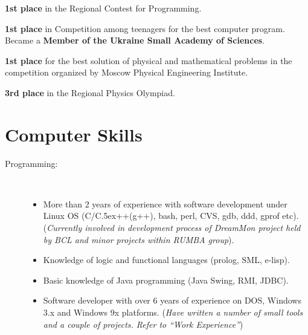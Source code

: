 \documentclass[10pt,overlapped,line]{res}
\def\Cplusplus{{\rm C\raise.5ex\hbox{\small ++}}}
\newcommand{\mplace}[1]{\textbf{#1}}
\newcommand{\wdescription}[1]{({\small \textit{#1}})}
\begin{document}
\begin{resume}
\begin{position}
\mplace{1st place} in the Regional Contest for Programming.
\end{position}

\begin{position}
  \mplace{1st place} in Competition among teenagers for the best
  computer program. Became a \mplace{Member of the Ukraine Small Academy
    of Sciences}.
\end{position}

\begin{position}
  \mplace{1st place} for the best solution of physical and mathematical
  problems in the competition organized by Moscow Physical Engineering Institute.
\end{position}

\begin{position}
  \mplace{3rd place} in the Regional Physics Olympiad.

\end{position}

\section{Computer Skills}
 \begin{description}
   \item[Programming:] \hspace*{\fill} \\
     \begin{itemize}
     \item More than 2 years of experience with software development
       under Linux OS (C/\Cplusplus(g++), bash, perl, CVS, gdb, ddd,
       gprof etc).  \wdescription{Currently involved in development
         process of DreamMon project held by BCL and minor projects within
         RUMBA group}.

     \item Knowledge of logic and functional languages (prolog, SML, e-lisp).

     \item Basic knowledge of Java programming (Java Swing, RMI,
       JDBC).

     \item Software developer with over 6 years of experience on DOS,
       Windows 3.x and Windows 9x platforms.
       \wdescription{Have written a number of small tools and a couple of
         projects. Refer to ``Work Experience''}
     

\end{itemize}
\end{description}
\end{resume}
\end{document}
